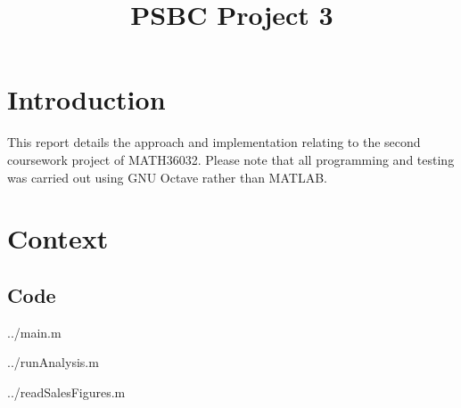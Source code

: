 \documentclass[10pt]{article}
\title{PSBC Project 3}
\newcommand{\inlinemaketitle}{{\let\newpage\relax\maketitle}}
\begin{document}
\inlinemaketitle
\section{Introduction}



This report details the approach and implementation relating to the second coursework project of MATH36032. Please note that all programming and testing was carried out using GNU Octave rather than MATLAB.

\section{Context}




\begin{appendices}

\section{Code}\label{appendix:code}
  {../main.m}

  {../runAnalysis.m}
 
  
    {../readSalesFigures.m}


\end{appendices}



\end{document}
